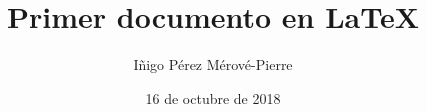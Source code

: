 \documentclass{article}
\begin{document}
\title{Primer documento en LaTeX}

\author{Iñigo Pérez Mérové-Pierre}

\date{16 de octubre de 2018}

\maketitle
\end{document}
